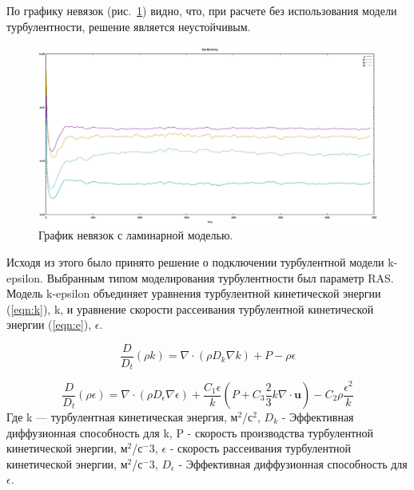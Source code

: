 \documentclass[14pt,a4paper]{article}
\begin{document}
       По графику невязок (рис.~\ref{fig:DRLam}) видно, что, при расчете без использования модели турбулентности, решение является неустойчивым. 
        
        \begin{figure}[H]
            \centering
            \includegraphics[width = 1\linewidth]{dataMonitoringLaminar}
            \caption{График невязок с ламинарной моделью.}
            \label{fig:DRLam}
        \end{figure}
        
        
        Исходя из этого было принято решение о подключении турбулентной модели k-epsilon. Выбранным типом моделирования турбулентности был параметр RAS. Модель k-epsilon объединяет уравнения турбулентной кинетической энергии (\ref{eqn:k}), k, и уравнение скорости рассеивания турбулентной кинетической энергии (\ref{eqn:e}), $\epsilon$.
        
        \begin{equation}\label{eqn:k}
            \frac{D}{D_{t}}(\rho k) = \nabla \cdot (\rho D_{k}\nabla k) + P - \rho\epsilon
        \end{equation} 
        
        \begin{equation}\label{eqn:e}
            \frac{D}{D_{t}}(\rho\epsilon) = \nabla \cdot (\rho D_{\epsilon}\nabla\epsilon) + \frac{C_{1}\epsilon}{k}(P + C_{3}\frac{2}{3}k\nabla \cdot \bm{u}) - C_{2}\rho\frac{\epsilon^2}{k}
        \end{equation} 
       Где k --- турбулентная кинетическая энергия, м$^2$/с$^2$, $D_{k}$ - Эффективная диффузионная способность для k, P - скорость производства турбулентной кинетической энергии, м$^2$/с$^-3$, $\epsilon$ - скорость рассеивания турбулентной кинетической энергии, м$^2$/с$^-3$, $D_{\epsilon}$ - Эффективная диффузионная способность для $\epsilon$.
               
\end{document}
